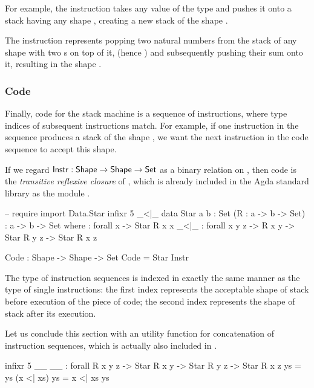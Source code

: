 For example, the instruction  takes any value of the type 
and pushes it onto a stack having any shape , creating a new
stack of the shape .

The instruction  represents popping two natural numbers from the
stack of any shape with two s on top of it, (hence
)
and subsequently pushing their sum onto it, resulting in the shape
.

\subsubsection{Code}

Finally, code for the stack machine is a sequence of instructions, where
type indices of subsequent instructions match. For example, if one instruction
in the sequence produces a stack of the shape ,
we want the next instruction in the code sequence to accept this shape.

If we regard
$\mathsf{Instr} : \mathsf{Shape} \to \mathsf{Shape} \to \mathsf{Set}$
as a binary relation on , then code is the \emph{transitive reflexive closure}
of , which is already included in the Agda standard library as the
module .

\begin{code}
  -- require import Data.Star
  infixr 5 _<|\_
  data Star {a b : Set} (R : a -> b -> Set) : a -> b -> Set where
    \nil : forall {x} -> Star R x x
    _<|\_ : forall {x y z} -> R x y -> Star R y z -> Star R x z
\end{code}

\begin{code}
  Code : Shape -> Shape -> Set
  Code = Star Instr
\end{code}

\noindent The type of instruction sequences is indexed in exactly the same
manner as the type of single instructions: the first index represents the
acceptable shape of stack before execution of the piece of code; the second
index represents the shape of stack after its execution.

Let us conclude this section with an utility function for concatenation of
instruction sequences, which is actually also included in .

\begin{code}
  infixr 5 _\app\_
  _\app\_ : forall {R x y z} -> Star R x y -> Star R y z -> Star R x z
  \nil \app ys = ys
  (x <| xs) \app ys = x <| xs \app ys
\end{code}

